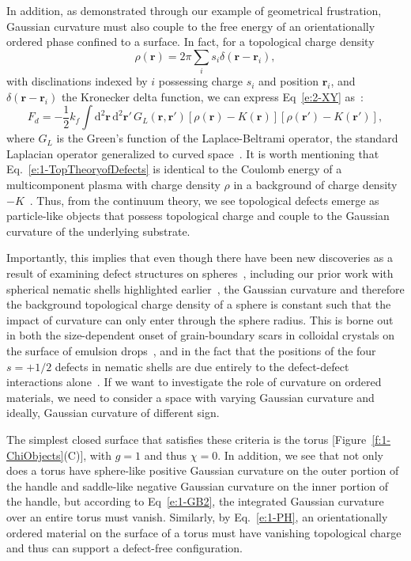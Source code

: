 In addition, as demonstrated through our example of geometrical frustration, Gaussian curvature must also couple to the free energy of an orientationally ordered phase confined to a surface.
In fact, for a topological charge density
\begin{equation}
  \rho(\mathbf{r}) = 2 \pi \sum\limits_i s_{i}\delta(\mathbf{r} - \mathbf{r}_{i}),
\end{equation}
with disclinations indexed by $i$ possessing charge $s_{i}$ and position $\mathbf{r}_{i}$, and $\delta(\mathbf{r} - \mathbf{r}_{i})$ the Kronecker delta function, we can express Eq~\ref{e:2-XY} as~\cite{RN42,RN175,RN17}:
\begin{equation}
  F_d = -\frac{1}{2} k_f \int \textrm{d}^2\mathbf{r} \, \textrm{d}^2\mathbf{r}' \, G_L(\mathbf{r},\mathbf{r}') [\rho(\mathbf{r})-K(\mathbf{r})] [\rho(\mathbf{r}')-K(\mathbf{r}')],\label{e:1-TopTheoryofDefects}
\end{equation}
where $G_L$ is the Green's function of the Laplace-Beltrami operator, the standard Laplacian operator generalized to curved space~\cite{RN17}.
It is worth mentioning that Eq.~\ref{e:1-TopTheoryofDefects} is identical to the Coulomb energy of a multicomponent plasma with charge density $\rho$ in a background of charge density $-K$~\cite{RN17}.
Thus, from the continuum theory, we see topological defects emerge as particle-like objects that possess topological charge and couple to the Gaussian curvature of the underlying substrate.

Importantly, this implies that even though there have been new discoveries as a result of examining defect structures on spheres~\cite{RN106,RN26,RN110,RN76,RN101,RN165}, including our prior work with spherical nematic shells highlighted earlier~\cite{RN45,RN105}, the Gaussian curvature and therefore the background topological charge density of a sphere is constant such that the impact of curvature can only enter through the sphere radius.
This is borne out in both the size-dependent onset of grain-boundary scars in colloidal crystals on the surface of emulsion drops~\cite{RN26,RN110}, and in the fact that the positions of the four $s = +1/2$ defects in nematic shells are due entirely to the defect-defect interactions alone~\cite{RN45}.
If we want to investigate the role of curvature on ordered materials, we need to consider a space with varying Gaussian curvature and ideally, Gaussian curvature of different sign.

The simplest closed surface that satisfies these criteria is the torus [Figure~\ref{f:1-ChiObjects}(C)], with $g = 1$ and thus $\chi = 0$.
In addition, we see that not only does a torus have sphere-like positive Gaussian curvature on the outer portion of the handle and saddle-like negative Gaussian curvature on the inner portion of the handle, but according to Eq~\ref{e:1-GB2}, the integrated Gaussian curvature over an entire torus must vanish.
Similarly, by Eq.~\ref{e:1-PH}, an orientationally ordered material on the surface of a torus must have vanishing topological charge and thus can support a defect-free configuration.

